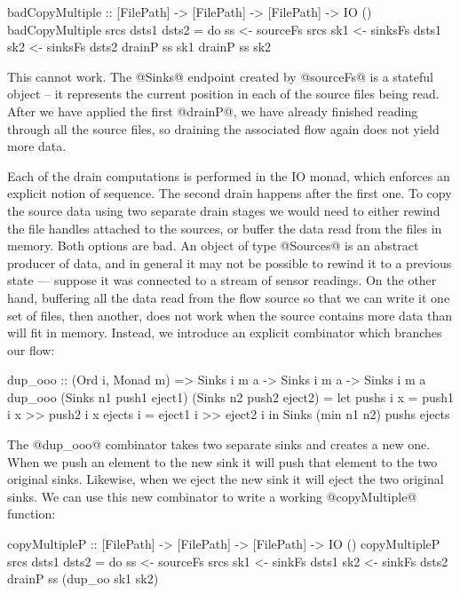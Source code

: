 \begin{code}
 badCopyMultiple 
  :: [FilePath] -> [FilePath] -> [FilePath] -> IO ()
 badCopyMultiple srcs dsts1 dsts2
  = do  ss  <- sourceFs srcs
        sk1 <- sinksFs  dsts1
        sk2 <- sinksFs  dsts2
        drainP ss sk1
        drainP ss sk2
\end{code}

This cannot work. The @Sinks@ endpoint created by @sourceFs@ is a stateful object -- it represents the current position in each of the source files being read. After we have applied the first @drainP@, we have already finished reading through all the source files, so draining the associated flow again does not yield more data. 

Each of the drain computations is performed in the IO monad, which enforces an explicit notion of sequence. The second drain happens after the first one. To copy the source data using two separate drain stages we would need to either rewind the file handles attached to the sources, or buffer the data read from the files in memory. Both options are bad. An object of type @Sources@ is an abstract producer of data, and in general it may not be possible to rewind it to a previous state --- suppose it was connected to a stream of sensor readings. On the other hand, buffering all the data read from the flow source so that we can write it one set of files, then another, does not work when the source contains more data than will fit in memory. Instead, we introduce an explicit combinator which branches our flow:

\begin{code}
dup_ooo :: (Ord i, Monad m)
       => Sinks i m a -> Sinks i m a -> Sinks i m a
dup_ooo (Sinks n1 push1 eject1) 
        (Sinks n2 push2 eject2)
 = let pushs  i x = push1 i x >> push2 i x
       ejects i   = eject1 i  >> eject2 i
   in  Sinks (min n1 n2) pushs ejects
\end{code}

The @dup_ooo@ combinator takes two separate sinks and creates a new one. When we push an element to the new sink it will push that element to the two original sinks. Likewise, when we eject the new sink it will eject the two original sinks. We can use this new combinator to write a working @copyMultiple@ function:

\begin{code}
copyMultipleP 
 :: [FilePath] -> [FilePath] -> [FilePath] -> IO ()
copyMultipleP srcs dsts1 dsts2
 = do  ss  <- sourceFs srcs
       sk1 <- sinkFs   dsts1
       sk2 <- sinkFs   dsts2 
       drainP ss (dup_oo sk1 sk2)
\end{code}

